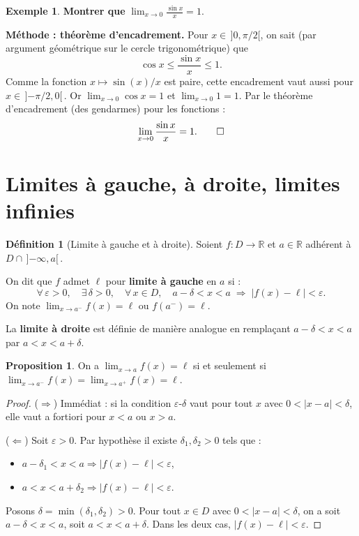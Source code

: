 \documentclass[12pt,a4paper,openany]{book}
\theoremstyle{definition}
\newtheorem{definition}{Définition}[chapter]
\newtheorem{proposition}{Proposition}[chapter]
\newtheorem{exemple}{Exemple}[chapter]
\newcommand{\R}{\mathbb{R}}
\begin{document}
\begin{exemple}\label{ex:limite-sinx-sur-x}
\textbf{Montrer que} $\displaystyle\lim_{x \to 0} \frac{\sin x}{x} = 1$.

\medskip
\textbf{Méthode : théorème d'encadrement.} Pour $x \in \,]0, \pi/2[$, on sait (par argument géométrique sur le cercle trigonométrique) que
\[
  \cos x \leqslant \frac{\sin x}{x} \leqslant 1.
\]
Comme la fonction $x \mapsto \sin(x)/x$ est paire, cette encadrement vaut aussi pour $x \in \,]{-\pi/2}, 0[\,$. Or $\lim_{x \to 0} \cos x = 1$ et $\lim_{x \to 0} 1 = 1$. Par le théorème d'encadrement (des gendarmes) pour les fonctions :
\[
  \lim_{x \to 0} \frac{\sin x}{x} = 1.  \qed
\]
\end{exemple}

\section{Limites à gauche, à droite, limites infinies}\label{sec:limites-laterales}

\begin{definition}[Limite à gauche et à droite]\label{def:limites-laterales}
Soient $f \colon D \to \R$ et $a \in \R$ adhérent à $D \cap \,]{-\infty}, a[\,$.

On dit que $f$ admet $\ell$ pour \textbf{limite à gauche} en $a$ si :
\[
  \forall\, \varepsilon > 0,\quad \exists\, \delta > 0,\quad
  \forall\, x \in D,\quad a - \delta < x < a \;\Longrightarrow\; |f(x) - \ell| < \varepsilon.
\]
On note $\lim_{x \to a^-} f(x) = \ell$ ou $f(a^-) = \ell$.

La \textbf{limite à droite} est définie de manière analogue en remplaçant $a - \delta < x < a$ par $a < x < a + \delta$.
\end{definition}

\begin{proposition}\label{prop:limite-laterale}
On a $\displaystyle\lim_{x \to a} f(x) = \ell$ si et seulement si $\displaystyle\lim_{x \to a^-} f(x) = \lim_{x \to a^+} f(x) = \ell$.
\end{proposition}

\begin{proof}
($\Rightarrow$) Immédiat : si la condition $\varepsilon$-$\delta$ vaut pour tout $x$ avec $0 < |x-a| < \delta$, elle vaut a fortiori pour $x < a$ ou $x > a$.

($\Leftarrow$) Soit $\varepsilon > 0$. Par hypothèse il existe $\delta_1, \delta_2 > 0$ tels que :
\begin{itemize}
  \item $a - \delta_1 < x < a \Rightarrow |f(x) - \ell| < \varepsilon$,
  \item $a < x < a + \delta_2 \Rightarrow |f(x) - \ell| < \varepsilon$.
\end{itemize}
Posons $\delta = \min(\delta_1, \delta_2) > 0$. Pour tout $x \in D$ avec $0 < |x-a| < \delta$, on a soit $a - \delta < x < a$, soit $a < x < a + \delta$. Dans les deux cas, $|f(x) - \ell| < \varepsilon$.
\end{proof}
\end{document}
